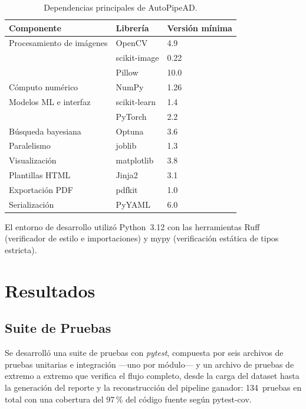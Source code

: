 \documentclass[conference,spanish]{IEEEtran}
\begin{document}
\begin{table}[t]
\centering
\renewcommand{\arraystretch}{1.2}
\caption{Dependencias principales de AutoPipeAD.}
\label{tab:tecnologias}
\begin{tabular}{@{}lll@{}}
\toprule
\textbf{Componente} & \textbf{Librería} & \textbf{Versión mínima} \\
\midrule
Procesamiento de imágenes & OpenCV        & 4.9  \\
                          & scikit-image  & 0.22 \\
                          & Pillow        & 10.0 \\
Cómputo numérico          & NumPy         & 1.26 \\
Modelos ML e interfaz     & scikit-learn  & 1.4  \\
                          & PyTorch       & 2.2  \\
Búsqueda bayesiana        & Optuna        & 3.6  \\
Paralelismo               & joblib        & 1.3  \\
Visualización             & matplotlib    & 3.8  \\
Plantillas HTML           & Jinja2        & 3.1  \\
Exportación PDF           & pdfkit        & 1.0  \\
Serialización             & PyYAML        & 6.0  \\
\bottomrule
\end{tabular}
\end{table}

El entorno de desarrollo utilizó Python~3.12 con las herramientas Ruff
(verificador de estilo e importaciones) y mypy (verificación estática de
tipos estricta).

\section{Resultados}

\subsection{Suite de Pruebas}

Se desarrolló una suite de pruebas con \textit{pytest}, compuesta por seis
archivos de pruebas unitarias e integración —uno por módulo— y un archivo
de pruebas de extremo a extremo que
verifica el flujo completo, desde la carga del dataset hasta la generación
del reporte y la reconstrucción del pipeline ganador: 134~pruebas en total
con una cobertura del 97\,\% del código fuente según pytest-cov.
\end{document}
